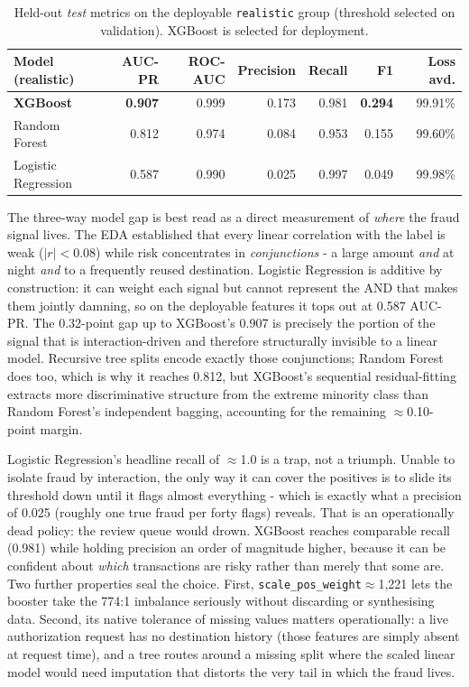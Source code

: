 \documentclass[11pt,a4paper]{report}
\newcommand{\code}[1]{\texttt{\small #1}}
\begin{document}
\begin{table}[h]
\centering
\small
\begin{tabular}{@{}l rrrrrr@{}}
\toprule
\textbf{Model (realistic)} & \textbf{AUC-PR} & \textbf{ROC-AUC} & \textbf{Precision} & \textbf{Recall} & \textbf{F1} & \textbf{Loss avd.}\\
\midrule
\textbf{XGBoost} & \textbf{0.907} & 0.999 & 0.173 & 0.981 & \textbf{0.294} & 99.91\%\\
Random Forest & 0.812 & 0.974 & 0.084 & 0.953 & 0.155 & 99.60\%\\
Logistic Regression & 0.587 & 0.990 & 0.025 & 0.997 & 0.049 & 99.98\%\\
\bottomrule
\end{tabular}
\caption{Held-out \emph{test} metrics on the deployable \code{realistic} group (threshold
selected on validation). XGBoost is selected for deployment.}
\label{tab:realistic}
\end{table}

The three-way model gap is best read as a direct measurement of \emph{where} the fraud signal lives. The EDA established that every linear correlation with the label is weak ($|r|<0.08$) while risk concentrates in \emph{conjunctions} - a large amount \emph{and} at night \emph{and} to a frequently reused destination. Logistic Regression is additive by construction: it can weight each signal but cannot represent the AND that makes them jointly damning, so on the deployable features it tops out at 0.587 AUC-PR. The 0.32-point gap up to XGBoost's 0.907 is precisely the portion of the signal that is interaction-driven and therefore structurally invisible to a linear model. Recursive tree splits encode exactly those conjunctions; Random Forest does too, which is why it reaches 0.812, but XGBoost's sequential residual-fitting extracts more discriminative structure from the extreme minority class than Random Forest's independent bagging, accounting for the remaining $\approx$0.10-point margin.

Logistic Regression's headline recall of $\approx$1.0 is a trap, not a triumph. Unable to isolate fraud by interaction, the only way it can cover the positives is to slide its threshold down until it flags almost everything - which is exactly what a precision of 0.025 (roughly one true fraud per forty flags) reveals. That is an operationally dead policy: the review queue would drown. XGBoost reaches comparable recall (0.981) while holding precision an order of magnitude higher, because it can be confident about \emph{which} transactions are risky rather than merely that some are. Two further properties seal the choice. First, \code{scale\_pos\_weight}$\approx$1{,}221 lets the booster take the 774:1 imbalance seriously without discarding or synthesising data. Second, its native tolerance of missing values matters operationally: a live authorization request has no destination history (those features are simply absent at request time), and a tree routes around a missing split where the scaled linear model would need imputation that distorts the very tail in which the fraud lives.
\end{document}
